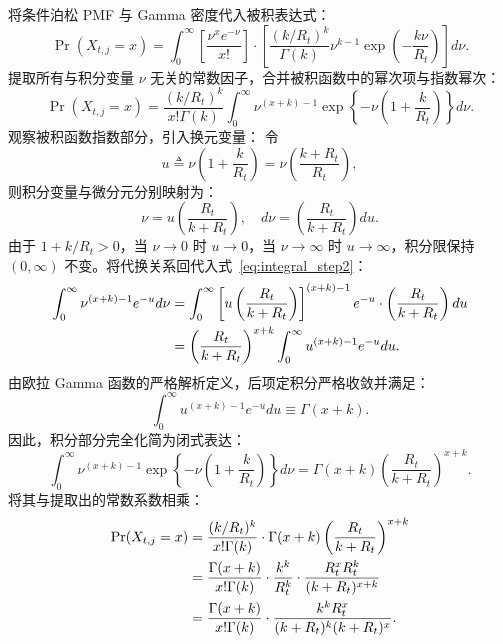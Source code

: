 将条件泊松 PMF 与 Gamma 密度代入被积表达式：
\begin{equation}
\Pr(X_{t,j} = x) = \int_0^\infty \left[ \frac{\nu^x e^{-\nu}}{x!} \right] \cdot \left[ \frac{(k / R_t)^k}{\Gamma(k)} \nu^{k-1} \exp\left( -\frac{k \nu}{R_t} \right) \right] d\nu.
\end{equation}
提取所有与积分变量 $\nu$ 无关的常数因子，合并被积函数中的幂次项与指数幂次：
\begin{equation}
\Pr(X_{t,j} = x) = \frac{(k / R_t)^k}{x! \Gamma(k)} \int_0^\infty \nu^{(x+k)-1} \exp\left\{ -\nu \left( 1 + \frac{k}{R_t} \right) \right\} d\nu. \label{eq:integral_step2}
\end{equation}
观察被积函数指数部分，引入换元变量：
令
\begin{equation}
u \triangleq \nu \left( 1 + \frac{k}{R_t} \right) = \nu \left( \frac{k + R_t}{R_t} \right),
\end{equation}
则积分变量与微分元分别映射为：
\begin{equation}
\nu = u \left( \frac{R_t}{k + R_t} \right), \quad d\nu = \left( \frac{R_t}{k + R_t} \right) du.
\end{equation}
由于 $1 + k/R_t > 0$，当 $\nu \to 0$ 时 $u \to 0$，当 $\nu \to \infty$ 时 $u \to \infty$，积分限保持 $(0, \infty)$ 不变。将代换关系回代入式~\eqref{eq:integral_step2}：
\begin{align}
\int_0^\infty \nu^{(x+k)-1} e^{-u} d\nu &= \int_0^\infty \left[ u \left( \frac{R_t}{k + R_t} \right) \right]^{(x+k)-1} e^{-u} \cdot \left( \frac{R_t}{k + R_t} \right) du \notag \\
&= \left( \frac{R_t}{k + R_t} \right)^{x+k} \int_0^\infty u^{(x+k)-1} e^{-u} du.
\end{align}
由欧拉 Gamma 函数的严格解析定义，后项定积分严格收敛并满足：
\begin{equation}
\int_0^\infty u^{(x+k)-1} e^{-u} du \equiv \Gamma(x+k).
\end{equation}
因此，积分部分完全化简为闭式表达：
\begin{equation}
\int_0^\infty \nu^{(x+k)-1} \exp\left\{ -\nu \left( 1 + \frac{k}{R_t} \right) \right\} d\nu = \Gamma(x+k) \left( \frac{R_t}{k + R_t} \right)^{x+k}.
\end{equation}
将其与提取出的常数系数相乘：
\begin{align}
\Pr(X_{t,j} = x) &= \frac{(k / R_t)^k}{x! \Gamma(k)} \cdot \Gamma(x+k) \left( \frac{R_t}{k + R_t} \right)^{x+k} \notag \\
&= \frac{\Gamma(x+k)}{x! \Gamma(k)} \cdot \frac{k^k}{R_t^k} \cdot \frac{R_t^x R_t^k}{(k + R_t)^{x+k}} \notag \\
&= \frac{\Gamma(x+k)}{x! \Gamma(k)} \cdot \frac{k^k R_t^x}{(k + R_t)^k (k + R_t)^x}.
\end{align}
